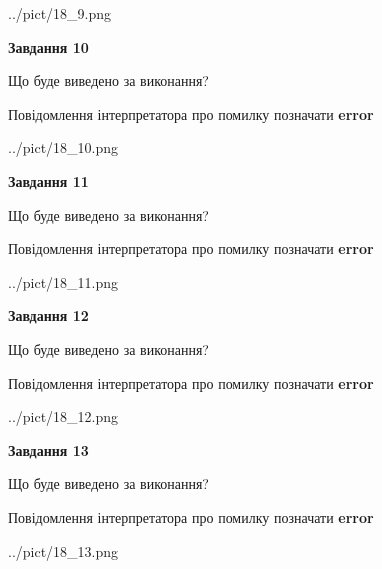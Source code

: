 \documentclass[11pt, ukrainian]{article}
\begin{document}
{\begin {large}
\begin{center}
	{../pict/18_9.png}
\end{center}
\newpage

{\begin {center}\textbf{Завдання 10}\end {center}}\par
Що буде виведено за виконання? \par
Повідомлення інтерпретатора про помилку позначати \textbf{error}

\begin{center}
	{../pict/18_10.png}
\end{center}
\newpage

{\begin {center}\textbf{Завдання 11}\end {center}}\par
Що буде виведено за виконання? \par
Повідомлення інтерпретатора про помилку позначати \textbf{error}

\begin{center}
	{../pict/18_11.png}
\end{center}
\newpage

{\begin {center}\textbf{Завдання 12}\end {center}}\par
Що буде виведено за виконання? \par
Повідомлення інтерпретатора про помилку позначати \textbf{error}

\begin{center}
	{../pict/18_12.png}
\end{center}
\newpage

{\begin {center}\textbf{Завдання 13}\end {center}}\par
Що буде виведено за виконання? \par
Повідомлення інтерпретатора про помилку позначати \textbf{error}

\begin{center}
	{../pict/18_13.png}
\end{center}
\newpage


\end{large}}
\end{document}
